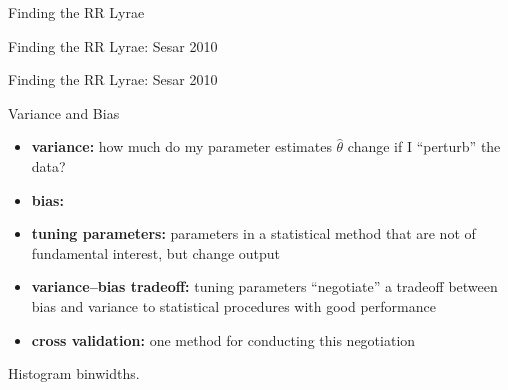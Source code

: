 \documentclass[12pt]{beamer}
\begin{document}
\begin{frame}{Finding the RR Lyrae}

\end{frame}



\begin{frame}{Finding the RR Lyrae: Sesar 2010}

\end{frame}

\begin{frame}{Finding the RR Lyrae: Sesar 2010}

\end{frame}


\begin{frame}{Variance and Bias}
  \begin{itemize}
  \item \textbf{variance:} how much do my parameter estimates $\widehat{\theta}$ change if I ``perturb'' the data?
  \item \textbf{bias:}
  \item \textbf{tuning parameters:} parameters in a statistical method that are not of fundamental interest, but change output
  \item \textbf{variance--bias tradeoff:} tuning parameters ``negotiate'' a tradeoff between bias and variance to statistical procedures with good performance
  \item \textbf{cross validation:} one method for conducting this negotiation
  \end{itemize}

{\small Histogram binwidths.}
\end{frame}
\end{document}
